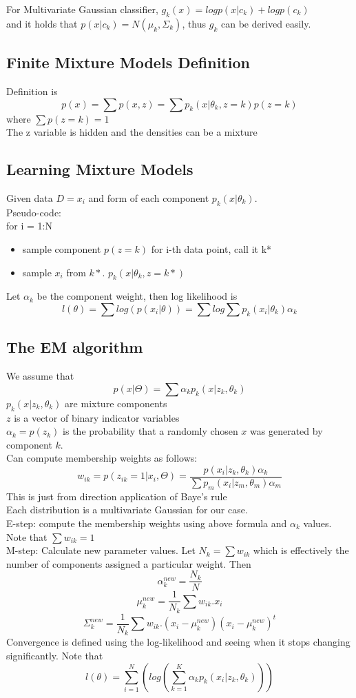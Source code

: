 \documentclass[11pt,psfig]{article}
\begin{document}
For Multivariate Gaussian classifier, $g_k(x) = log p(x|c_k) + log p(c_k)$\\
and it holds that $p(x|c_k) = N(\mu_k,\Sigma_k)$, thus $g_k$ can be derived easily.

\subsection*{Finite Mixture Models Definition}
Definition is
\[
p(x) = \sum{p(x,z)} = \sum p_k(x|\theta_k,z=k)p(z=k)
\]
where $\sum{p(z=k)}=1$
\\
The z variable is hidden and the densities can be a mixture

\subsection*{Learning Mixture Models}

Given data $D={x_i}$ and form of each component $p_k(x|\theta_k)$. 
\\
Pseudo-code:
\\
for i = 1:N
\begin{itemize}
\item sample component $p(z=k)$ for i-th data point, call it k*
\item sample $x_i$ from $k*$. $p_k(x|\theta_k,z=k*)$
\end{itemize}

Let $\alpha_k$ be the component weight, then log likelihood is
\[
l(\theta) = \sum{log(p(x_i|\theta))} = \sum{log\sum{p_k(x_i|\theta_k)\alpha_k}}
\]

\subsection*{The EM algorithm}

We assume that
\[
p(x|\Theta) = \sum{\alpha_k p_k(x|z_k,\theta_k)}
\]
$p_k(x|z_k,\theta_k)$ are mixture components\\
$z$ is a vector of binary indicator variables\\
$\alpha_k = p(z_k)$ is the probability that a randomly chosen $x$ was generated by component $k$. \\
Can compute membership weights as follows:
\[
w_{ik} = p(z_{ik}=1|x_i,\Theta) = \frac{p(x_i|z_k,\theta_k)\alpha_k}{\sum{p_m(x_i|z_m,\theta_m)\alpha_m}}
\]
This is just from direction application of Baye's rule\\
Each distribution is a multivariate Gaussian for our case. \\
E-step: compute the membership weights using above formula and $\alpha_k$ values. \\
Note that $\sum{w_{ik}} = 1$
\\
M-step: Calculate new parameter values. Let $N_k = \sum{w_{ik}}$ which is effectively the number of components assigned a particular weight. Then
\[
\alpha_k^{new} = \frac{N_k}{N}
\]
\[
\mu_k^{new} = \frac{1}{N_k} \sum{w_{ik}.x_i}
\]
\[
\Sigma_k^{new} = \frac{1}{N_k} \sum{w_{ik}.(x_i-\mu_k^{new})(x_i-\mu_k^{new})^t}
\]
Convergence is defined using the log-likelihood and seeing when it stops changing significantly. Note that
\[
l(\theta) = \sum_{i=1}^N{(log(\sum_{k=1}^K{\alpha_k p_k(x_i|z_k,\theta_k)}))}
\]
\end{document}
